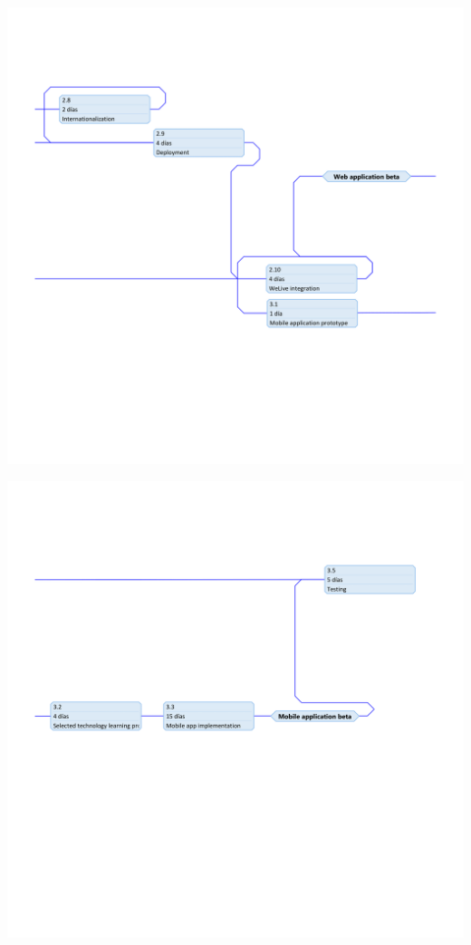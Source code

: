 \documentclass{DeustoFDP}
\begin{document}
\begin{center}
	\includegraphics[width=1\linewidth]{fig/precedence-3}
\end{center}
\begin{center}
	\includegraphics[width=1\linewidth]{fig/precedence-4}
\end{center}
\newpage
\end{document}
